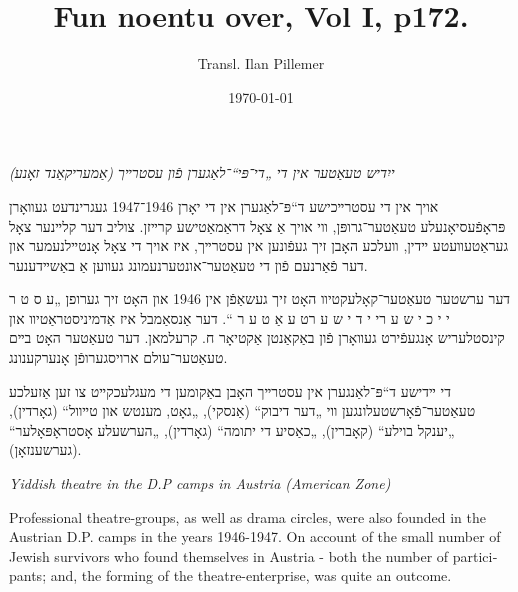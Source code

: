 \documentclass{article}
\begin{document}
\renewcommand{\abstractname}{\vspace{-\baselineskip}}
\title{Fun noentu over, Vol I, p172.}
\author{Transl. Ilan Pillemer}
\date{\today}

\maketitle
{}
\newline

\begin{pairs}

\begin{Rightside}

\begin{RTL}
\begin{hebrew}
\beginnumbering
\autopar
\emph{
ייִדיש טעאַטער אין די „די־פּי“־לאַגערן פֿון עסטרײך (אַמעריקאַנד זאָנע)
}
\newline

אויך אין די עסטרײכישע ד“פּ־לאַגערן אין די יאָרן 1946־1947
געגרינדעט געװאָרן פּראָפֿעסיאָנעלע טעאַטער־גרופּן, װי אויך אַ צאָל דראַמאַטישע קרײזן.
 צוליב דער קלײנער צאָל געראַטעװעטע ײדין, װעלכע האָבן זיך געפֿונען אין עסטרײך, איז אויך די צאָל אָנטײלנעמער און
 דער פֿאַרנעם פֿון די טעאַטער־אונטערנעמונג געװען אַ באַשײדענער.

דער ערשטער טעאַטער־קאָלעקטיװ האָט זיך געשאַפֿן אין 1946 און האָט זיך גערופן „ע ס ט ר י י כ י ש ע ר\space\space  י י ד י ש ע ר\space\space  ט ע אַ ט ע ר “.
דער אַנסאַמבל איז אַדמיניסטראַטיװ און קינסטלעריש אָנגעפֿירט געװאָרן פֿון באַקאַנטן אַקטיאָר ח. קרעלמאן. 
דער טעאַטער האָט בײם טעאַטער־עולם ארויסגערופֿן אָנערקענונג.

די ײדישע ד“פּ־לאַנגערן אין עסטרײך האָבן באַקומען די מעגלעכקײט צו זען אַזעלכע טעאַטער־פֿאָרשטעלונגען װי „דער דיבוק“ (אַנסקי),
„גאָט, מענטש און טײװל“ (גאָרדין), „יענקל בוילע“ (קאָברין), „כאַסיע די יתומה“ (גאָרדין),
„הערשעלע אָסטראָפּאָלער“ (גערשענזאָן).

\endnumbering
\end{hebrew}
\end{RTL}
\end{Rightside}


\begin{Leftside}
\begin{english}
\beginnumbering
\autopar
\emph{
Yiddish theatre in the D.P camps in Austria (American Zone)
}
\newline 
 
Professional theatre-groups, as well as drama circles, were also founded in the Austrian D.P. camps in the years 1946-1947.
On account of the small number of Jewish survivors who found themselves in Austria - both the number of participants; and, the forming of
the theatre-enterprise, was quite an outcome.


\end{english}
\end{Leftside}
\end{pairs}
\end{document}
